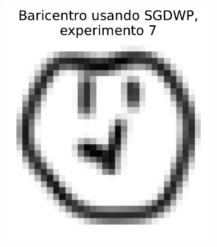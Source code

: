 \begin{figure}[H]
\begin{subfigure}[b]{0.17\textwidth}
        \label{fig:bar-SGDWP-exp-06}
    \end{subfigure}
    \hfill
    \begin{subfigure}[b]{0.17\textwidth}
        \centering
        \includegraphics[width=\textwidth]{img/sgdwp/bar-SGDWP-exp-07.pdf}
        \label{fig:bar-SGDWP-exp-07}
    \end{subfigure}
    \hfill
    \begin{subfigure}[b]{0.17\textwidth}
        \centering

\end{subfigure}
\end{figure}
